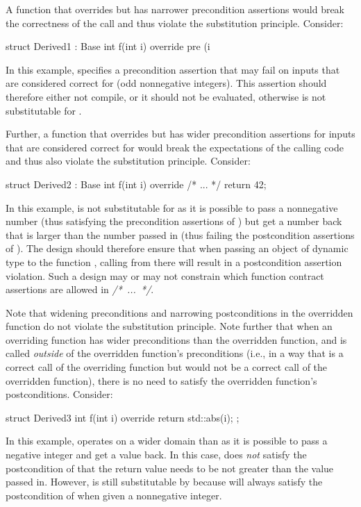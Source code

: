A function that overrides  but has narrower precondition assertions would break the correctness of the call and thus violate the substitution principle. Consider:
\begin{codeblock}
struct Derived1 : Base {
  int f(int i) override
    pre (i %
}
\end{codeblock}
In this example,  specifies a precondition assertion that may fail on inputs that are considered correct for  (odd nonnegative integers). This assertion should therefore either not compile, or it should not be evaluated, otherwise  is not substitutable for .

Further, a function that overrides  but has wider precondition assertions for inputs that are considered correct for  would break the expectations of the calling code and thus also violate the substitution principle. Consider:

\begin{codeblock}
struct Derived2 : Base {
  int f(int i) override /* ... */ {
    return 42;
  }
}
\end{codeblock}

In this example,  is not substitutable for  as it is possible to pass a nonnegative number (thus satisfying the precondition assertions of ) but get a number back that is larger than the number passed in (thus failing the postcondition assertions of ). The design should therefore ensure that when passing an object of dynamic type  to the function , calling  from there will result in a postcondition assertion violation. Such a design may or may not constrain which function contract assertions are allowed in \mbox{\emph{/* ... */}}.

Note that widening preconditions and narrowing postconditions in the overridden function do not violate the substitution principle. Note further that when an overriding function has wider preconditions than the overridden function, and is called \emph{outside} of the overridden function's preconditions (i.e., in a way that is a correct call of the overriding function but would not be a correct call of the overridden function), there is no need to satisfy the overridden function's postconditions. Consider:

\begin{codeblock}
struct Derived3 {
  int f(int i) override {
    return std::abs(i);
  }
};
\end{codeblock}
In this example,  operates on a wider domain than  as it is possible to pass a negative integer and get a value back. In this case,   does \emph{not} satisfy the postcondition of  that the return value needs to be not greater than the value passed in. However,  is still substitutable by  because  will always satisfy the postcondition of  when given a nonnegative integer.

